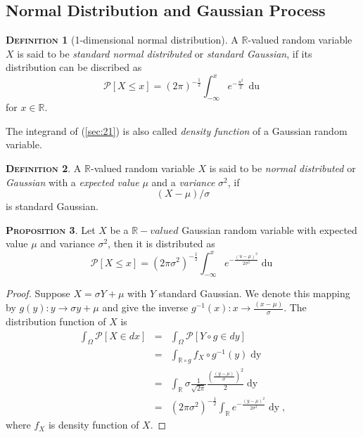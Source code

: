 \documentclass[a4paper, twoside, 11pt]{article}
\theoremstyle{definition}
\newtheorem{definition}{\scshape Definition}[section]
\newtheorem{proposition}[definition]{\scshape Proposition}
\newcommand{\sqbr}[1]{\left[ {#1} \right]}
\begin{document}
\subsection{Normal Distribution and  Gaussian Process}
\begin{definition}[1-dimensional normal distribution]
  A $\mathbb{R}$-valued random variable $X$ is said to be \emph{standard normal distributed} or \emph{standard Gaussian}, if its distribution can be discribed as
  \begin{equation}
	\mathcal{P}\sqbr{X \le x} = (2\pi)^{-\frac{1}{2}}\int_{-\infty}^{x} e^{-\frac{u^2}{2}}\,\mathop{du}  
	\label{sec:21}
  \end{equation}
  for $x \in \mathbb{R}$.
\end{definition}
The integrand of (\ref{sec:21}) is also called \emph{density function} of a Gaussian random variable.

\begin{definition}
  A $\mathbb{R}$-valued random variable $X$ is said to be \emph{normal distributed} or \emph{Gaussian} with a \emph{expected value} $\mu$ and a \emph{variance} $\sigma^2$, if
\[
  (X-\mu) / \sigma
\]
is standard Gaussian.
\end{definition}

\begin{proposition}
  Let $X$ be a $\mathbb{R}-valued$ Gaussian random variable with expected value $\mu$ and variance $\sigma^2$, then it is distributed as
  \begin{equation*}
	\mathcal{P}[X\le x] = (2\pi\sigma^2)^{-\frac{1}{2}}\int_{-\infty}^x e^{-\frac{(u-\mu)^2}{2\sigma^2}}\mathop{du}
  \end{equation*}
\end{proposition}

\begin{proof}
  Suppose $X = \sigma Y + \mu$ with $Y$ standard Gaussian. We denote this mapping by $g(y) : y \rightarrow \sigma y + \mu$ and give the inverse $g^{-1}(x) : x \rightarrow \frac{(x-\mu)}{\sigma}$. The distribution function of $X$ is 
  \begin{eqnarray*}
	\int_\Omega \mathcal{P}[X \in dx] &=& \int_\Omega \mathcal{P}[Y \circ g \in dy] \\
	&=& \int_{\mathbb{R}\circ g} f_X \circ g^{-1}(y) \mathop{dy}\\
	&=& \int_{\mathbb{R}} \sigma \frac{1}{\sqrt{2\pi}} \frac{(\frac{(y-\mu)}{\sigma})^2}{2} \mathop{dy}\\
	&=&  (2\pi\sigma^2)^{-\frac{1}{2}}\int_{\mathbb{R}} e^{-\frac{(y-\mu)^2}{2\sigma^2}}\mathop{dy} ,
  \end{eqnarray*}
 where $f_X$ is density function of $X$.
\end{proof}
\end{document}
